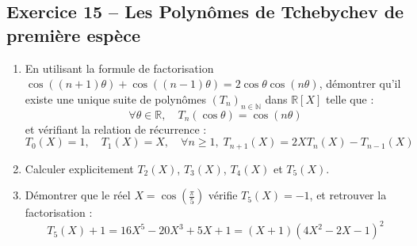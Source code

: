 \documentclass[11pt,a4paper]{article}
\newcommand{\N}{\mathbb{N}}
\newcommand{\R}{\mathbb{R}}
\begin{document}
\vspace{0.3cm}

\subsection*{Exercice 15 -- Les Polynômes de Tchebychev de première espèce}

\begin{enumerate}[label=\arabic*.]
    \item En utilisant la formule de factorisation $\cos((n+1)\theta) + \cos((n-1)\theta) = 2\cos\theta \cos(n\theta)$, démontrer qu'il existe une unique suite de polynômes $(T_n)_{n \in \N}$ dans $\R[X]$ telle que :
    \[
    \forall \theta \in \R, \quad T_n(\cos\theta) = \cos(n\theta)
    \]
    et vérifiant la relation de récurrence :
    \[
    T_0(X) = 1, \quad T_1(X) = X, \quad \forall n \ge 1, \; T_{n+1}(X) = 2X T_n(X) - T_{n-1}(X)
    \]
    \item Calculer explicitement $T_2(X)$, $T_3(X)$, $T_4(X)$ et $T_5(X)$.
    \item Démontrer que le réel $X = \cos\left(\frac{\pi}{5}\right)$ vérifie $T_5(X) = -1$, et retrouver la factorisation :
    \[
    T_5(X) + 1 = 16X^5 - 20X^3 + 5X + 1 = (X + 1)(4X^2 - 2X - 1)^2
    \]
\end{enumerate}
\end{document}
